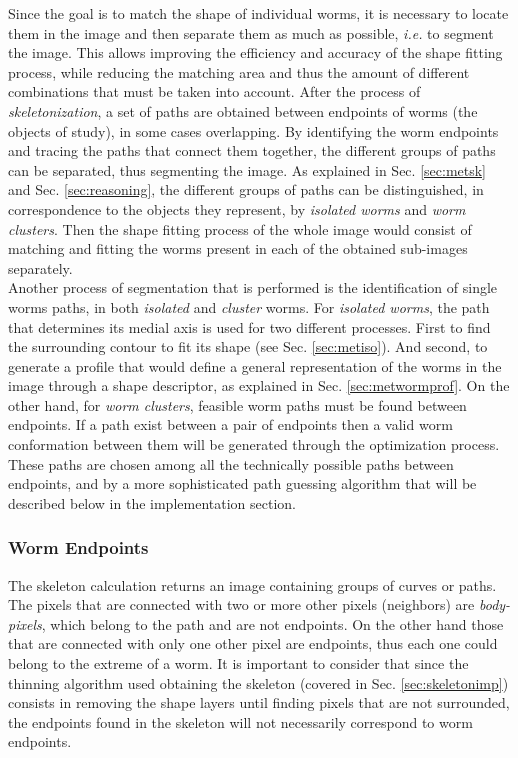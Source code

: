 Since the goal is to match the shape of individual worms,
it is necessary to locate them in the image and then separate them 
as much as possible, \emph{i.e.} to segment the image.
This allows improving the efficiency and accuracy of the 
shape fitting process, while reducing the matching area and thus the amount of 
different combinations that must be taken into account. After the process of 
\emph{skeletonization}, a set of paths are obtained 
between endpoints of worms (the objects of study), in some cases overlapping. 
By identifying the worm endpoints and tracing the paths that connect them together,
the different groups of paths can be separated, thus segmenting the image.
As explained in Sec. \ref{sec:metsk} and Sec. \ref{sec:reasoning}, the different groups
of paths can be distinguished, in correspondence to the objects they represent,
by \emph{isolated worms} and \emph{worm clusters}. Then the shape fitting process
of the whole image would consist of matching and fitting the worms present in each of
the obtained sub-images separately.\\

Another process of segmentation that is performed is the identification of single
worms paths, in both \emph{isolated} and \emph{cluster} worms. For \emph{isolated worms},
the path that determines its medial axis is used for two different processes. 
First to find the surrounding contour to
fit its shape (see Sec. \ref{sec:metiso}). And second, to generate a profile that 
would define a general representation of the worms in the image through a shape
descriptor, as explained in Sec. \ref{sec:metwormprof}.
On the other hand, for \emph{worm clusters}, feasible worm paths must be found between endpoints. 
If a path exist between a pair of endpoints then a valid worm conformation between them will
be generated through the optimization process.
These paths are chosen among all the technically possible paths between endpoints, and by
a more sophisticated path guessing algorithm that will be described below in the
implementation section.


\subsubsection*{Worm Endpoints}
\label{sec:wend}
The skeleton calculation returns an image 
containing groups of curves or paths.
The pixels that are connected with 
two or more other pixels (neighbors) are \emph{body-pixels}, which belong 
to the path and are not endpoints. On the other hand those that are connected with 
only one other pixel are endpoints, thus each one could belong to the extreme of a
worm. It is important to consider that since the thinning algorithm used obtaining the skeleton (covered in Sec. \ref{sec:skeletonimp}) consists in removing the shape
layers until finding pixels that are not surrounded, the endpoints found in the
skeleton will not necessarily correspond to worm endpoints.\\

